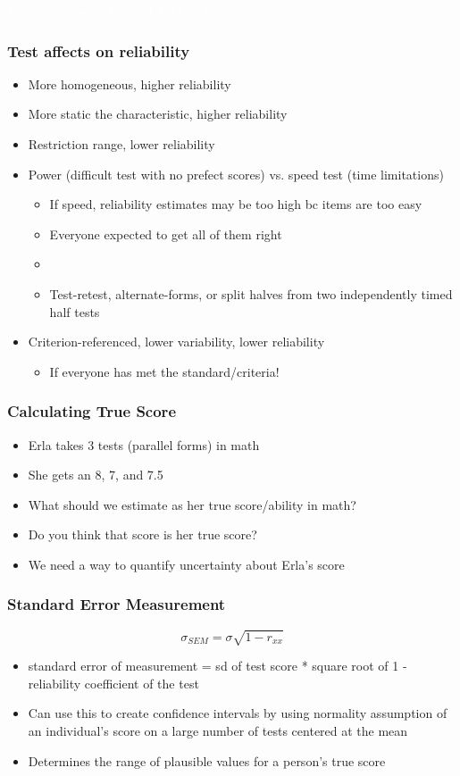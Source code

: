 \documentclass[dvipsnames]{beamer}\usepackage[]{graphicx}\usepackage[]{color}
\begin{document}
{
\begin{frame}
\centering\Huge \textcolor{white}{Make sure you understand Table 5-4!}
\end{frame}
}

\begin{frame}
\frametitle{Test affects on reliability}
\begin{itemize}
\item More homogeneous, higher reliability
\item More static the characteristic, higher reliability
\item Restriction range, lower reliability
\item Power (difficult test with no prefect scores) vs. speed test (time limitations)
  \begin{itemize}
  \item If speed, reliability estimates may be too high bc items are too easy
  \item Everyone expected to get all of them right
  \item \item Test-retest, alternate-forms, or split halves from two independently timed half tests
  \end{itemize}
\item Criterion-referenced, lower variability, lower reliability
  \begin{itemize}
    \item If everyone has met the standard/criteria!
  \end{itemize}
 \end{itemize}
\end{frame}

\begin{frame}
\frametitle{Calculating True Score}
\begin{itemize}
  \item Erla takes 3 tests (parallel forms) in math
  \item She gets an 8, 7, and 7.5
  \item What should we estimate as her true score/ability in math?
  \item Do you think that score is her true score?
  \item<2-> \textcolor{wared}{We need a way to quantify uncertainty about Erla's score}
\end{itemize}
\end{frame}

\begin{frame}
\frametitle{Standard Error Measurement}
$$\sigma_{SEM} = \sigma\sqrt{1 - r_{xx}}$$
\begin{itemize}
\item standard error of measurement = sd of test score * square root of 1 - reliability coefficient of the test
  \item<2->Can use this to create confidence intervals by using normality assumption of an individual's score on a large number of tests centered at the mean
  \item<2-> Determines the range of plausible values for a person's true score
\end{itemize}
\end{frame}
\end{document}
